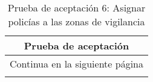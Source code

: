 \begin{longtable}{|p{6.7cm}|p{6.7cm}|}
    \caption{Prueba de aceptación 6: Asignar policías a las zonas de vigilancia} \label{tab:prueba-6}
    \\
    \hline
    \multicolumn{2}{|c|}{\textbf{Prueba de aceptación}}                                                                                                                                                                                                                                                                                                        \\
    \hline

    \endfirsthead

    \hline
    \endhead

    \hline
    \multicolumn{2}{|c|}{{Continua en la siguiente página}}                                                                                                                                                                                                                                                                                                    \\
    \hline
    \endfoot


\end{longtable}
